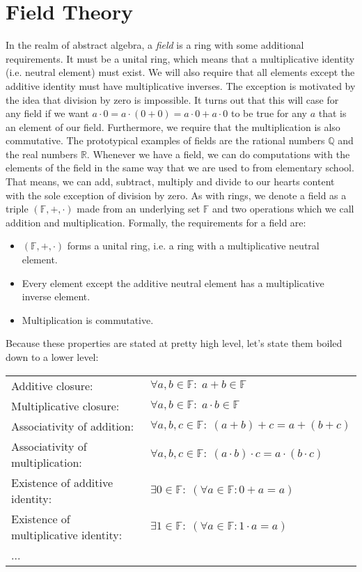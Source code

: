 \section{Field Theory}
In the realm of abstract algebra, a \emph{field} is a ring with some additional requirements. It must be a unital ring, which means that a multiplicative identity (i.e. neutral element) must exist. We will also require that all elements except the additive identity must have multiplicative inverses. The exception is motivated by the idea that division by zero is impossible. It turns out that this will case for any field if we want $a \cdot 0 = a \cdot (0 + 0) = a \cdot 0 + a \cdot 0$ to be true for any $a$ that is an element of our field. Furthermore, we require that the multiplication is also commutative. The prototypical examples of fields are the rational numbers $\mathbb{Q}$ and the real numbers $\mathbb{R}$. Whenever we have a field, we can do computations with the elements of the field in the same way that we are used to from elementary school. That means, we can add, subtract, multiply and divide to our hearts content with the sole exception of division by zero. As with rings, we denote a field as a triple $(\mathbb{F}, +, \cdot)$ made from an underlying set $\mathbb{F}$ and two operations which we call addition and multiplication. Formally, the requirements for a field are:
\begin{itemize}
\item $(\mathbb{F},+,\cdot)$ forms a unital ring, i.e. a ring with a multiplicative neutral element.
\item Every element except the additive neutral element has a multiplicative inverse element.
\item Multiplication is commutative.
\end{itemize}
Because these properties are stated at pretty high level, let's state them boiled down to a lower level:

\medskip
\begin{tabular}{l l}
Additive closure: 
& $\forall a,b \in \mathbb{F}: \; a + b \in \mathbb{F}$  \\	
Multiplicative closure: 
& $\forall a,b \in \mathbb{F}: \; a \cdot b \in \mathbb{F}$  \\	
Associativity of addition: 
& $\forall a,b,c \in \mathbb{F}: \;  (a + b) + c = a + (b + c)$   \\
Associativity of multiplication: 
& $\forall a,b,c \in \mathbb{F}: \;  (a \cdot b) \cdot c = a \cdot (b \cdot c)$   \\
Existence of additive identity: 
& $\exists 0 \in \mathbb{F}: \; (\forall a \in \mathbb{F}: 0 + a = a)$ \\
Existence of multiplicative identity: 
& $\exists 1 \in \mathbb{F}: \; (\forall a \in \mathbb{F}: 1 \cdot a = a)$ \\

...
\end{tabular}
\medskip



